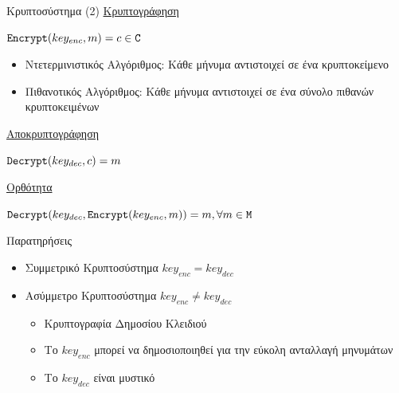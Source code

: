 \documentclass[handout]{beamer}
\begin{document}
\begin{frame}{Κρυπτοσύστημα (2)}
\underline{Κρυπτογράφηση}

$\mathtt{Encrypt}(key_{enc},m) = c \in \mathtt{C}$ 
\begin{itemize}
\item Ντετερμινιστικός Αλγόριθμος: Κάθε μήνυμα αντιστοιχεί σε ένα κρυπτοκείμενο
\item Πιθανοτικός Αλγόριθμος: Κάθε μήνυμα αντιστοιχεί σε ένα σύνολο πιθανών κρυπτοκειμένων \pause
\end{itemize}

\underline{Αποκρυπτογράφηση}

$\mathtt{Decrypt}(key_{dec},c) = m$ \pause

\underline{Ορθότητα}

$\mathtt{Decrypt}(key_{dec}, \mathtt{Encrypt}(key_{enc}, m)) = m, \forall m \in \mathtt{M}$
\end{frame}

\begin{frame}{Παρατηρήσεις}
\begin{itemize}
\item Συμμετρικό Κρυπτοσύστημα $key_{enc} = key_{dec}$ \pause
\item Ασύμμετρο Κρυπτοσύστημα $key_{enc} \neq key_{dec}$ \pause
\begin{itemize}
\item Κρυπτογραφία Δημοσίου Κλειδιού 
\item Το $key_{enc}$ μπορεί να δημοσιοποιηθεί για την εύκολη ανταλλαγή μηνυμάτων 
\item Το $key_{dec}$ είναι μυστικό
\end{itemize}
\end{itemize}
\end{frame}
\end{document}
